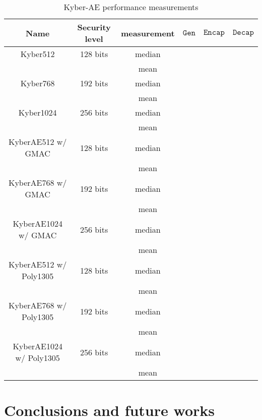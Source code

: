 \documentclass[floatrow,journal=tches,submission]{iacrtrans}
\newcommand{\keygen}{\texttt{Gen}}
\newcommand{\encap}{\texttt{Encap}}
\newcommand{\decap}{\texttt{Decap}}
\begin{document}
\begin{table}[H]
    \centering
    \begin{tabular}{|c|c|c|c|c|c|}
        \hline
        Name & Security level & measurement & $\keygen$ & $\encap$ & $\decap$ \\
        \hline
        Kyber512 & 128 bits & median &  & &  \\
        & & mean &  & &  \\
        \hline
        Kyber768 & 192 bits & median &  & &  \\
        & & mean &  & &  \\
        \hline
        Kyber1024 & 256 bits & median &  & &  \\
        & & mean &  & &  \\
        \hline
        KyberAE512 w/ GMAC& 128 bits & median &  & &  \\
        & & mean &  & &  \\
        \hline
        KyberAE768 w/ GMAC& 192 bits & median &  & &  \\
        & & mean &  & &  \\
        \hline
        KyberAE1024 w/ GMAC& 256 bits & median &  & &  \\
        & & mean &  & &  \\
        \hline
        KyberAE512 w/ Poly1305& 128 bits & median &  & &  \\
        & & mean &  & &  \\
        \hline
        KyberAE768 w/ Poly1305& 192 bits & median &  & &  \\
        & & mean &  & &  \\
        \hline
        KyberAE1024 w/ Poly1305& 256 bits & median &  & &  \\
        & & mean &  & &  \\
        \hline
    \end{tabular}
    \caption{Kyber-AE performance measurements}\label{tbl:kyber-ae-perf}
\end{table}

\section{Conclusions and future works}\label{sec:future-works}



\end{document}
